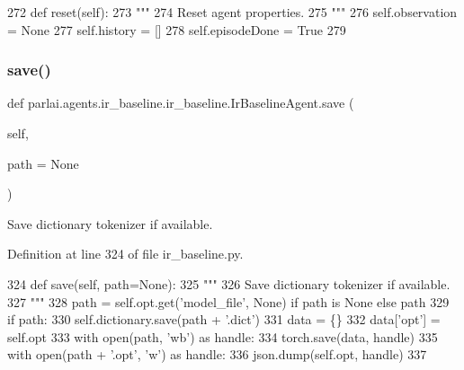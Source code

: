 \begin{DoxyCode}
272     \textcolor{keyword}{def }reset(self):
273         \textcolor{stringliteral}{"""}
274 \textcolor{stringliteral}{        Reset agent properties.}
275 \textcolor{stringliteral}{        """}
276         self.observation = \textcolor{keywordtype}{None}
277         self.history = []
278         self.episodeDone = \textcolor{keyword}{True}
279 
\end{DoxyCode}
\mbox{\label{classparlai_1_1agents_1_1ir__baseline_1_1ir__baseline_1_1IrBaselineAgent_af0deeaf3d545dac60187f95d30b48171}} 
\subsubsection{\texorpdfstring{save()}{save()}}
{\footnotesize\ttfamily def parlai.\+agents.\+ir\+\_\+baseline.\+ir\+\_\+baseline.\+Ir\+Baseline\+Agent.\+save (\begin{DoxyParamCaption}\item[{}]{self,  }\item[{}]{path = {\ttfamily None} }\end{DoxyParamCaption})}

\begin{DoxyVerb}Save dictionary tokenizer if available.
\end{DoxyVerb}
 

Definition at line 324 of file ir\+\_\+baseline.\+py.


\begin{DoxyCode}
324     \textcolor{keyword}{def }save(self, path=None):
325         \textcolor{stringliteral}{"""}
326 \textcolor{stringliteral}{        Save dictionary tokenizer if available.}
327 \textcolor{stringliteral}{        """}
328         path = self.opt.get(\textcolor{stringliteral}{'model\_file'}, \textcolor{keywordtype}{None}) \textcolor{keywordflow}{if} path \textcolor{keywordflow}{is} \textcolor{keywordtype}{None} \textcolor{keywordflow}{else} path
329         \textcolor{keywordflow}{if} path:
330             self.dictionary.save(path + \textcolor{stringliteral}{'.dict'})
331             data = \{\}
332             data[\textcolor{stringliteral}{'opt'}] = self.opt
333             with open(path, \textcolor{stringliteral}{'wb'}) \textcolor{keyword}{as} handle:
334                 torch.save(data, handle)
335             with open(path + \textcolor{stringliteral}{'.opt'}, \textcolor{stringliteral}{'w'}) \textcolor{keyword}{as} handle:
336                 json.dump(self.opt, handle)
337 
\end{DoxyCode}


